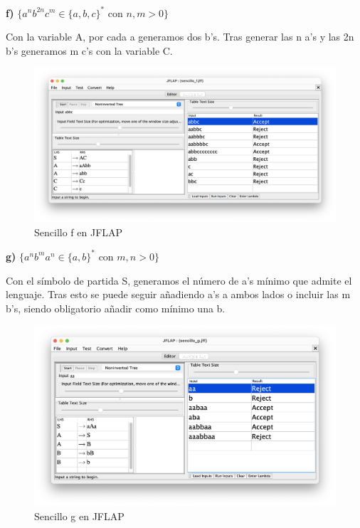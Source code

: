 \textbf{f)}  $\{ a^{n} b^{2n} c^{m} \in \{a,b,c\}^{\ast}$ con $n,m > 0\}$

Con la variable A, por cada a generamos dos b's. Tras generar las n a's y las 2n b's generamos m c's con la variable C.

\begin{figure}[H] 
	\centering
	\includegraphics[scale=0.35]{../practica_1/images/sencillo_f.png} 
	\caption{Sencillo f en JFLAP} 
    \label{fig:sencillo_f}
\end{figure}

\textbf{g)} $\{ a^{n} b^{m} a^{n} \in \{a,b\}^{\ast}$ con $m,n > 0\}$

Con el símbolo de partida S, generamos el número de a's mínimo que admite el lenguaje. Tras esto se puede seguir añadiendo a's a ambos lados o incluir las m b's,
siendo obligatorio añadir como mínimo una b. 

\begin{figure}[H] 
	\centering
	\includegraphics[scale=0.4]{../practica_1/images/sencillo_g.png} 
	\caption{Sencillo g en JFLAP} 
    \label{fig:sencillo_g}
\end{figure}


